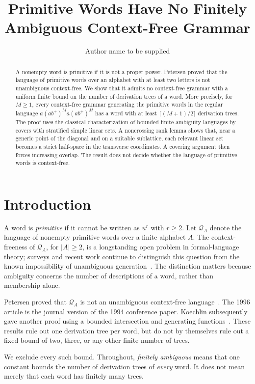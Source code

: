 \documentclass[a4paper,USenglish,cleveref,autoref]{lipics-v2021}
\title{Primitive Words Have No Finitely Ambiguous Context-Free Grammar}
\author{Author name to be supplied}{Affiliation and country to be supplied}{}{}{}
\newcommand{\Q}{\mathcal Q}
\begin{document}
\maketitle
\begin{abstract}
A nonempty word is primitive if it is not a proper power.
Petersen proved that the language of primitive words over an alphabet with at least two letters is not unambiguous context-free.
We show that it admits no context-free grammar with a uniform finite bound on the number of derivation trees of a word.
More precisely, for $M\geq 1$, every context-free grammar generating the primitive words in the regular language $a(ab^+)^M a(ab^+)^M$ has a word with at least $\lceil(M+1)/2\rceil$ derivation trees.
The proof uses the classical characterization of bounded finite-ambiguity languages by covers with stratified simple linear sets.
A noncrossing rank lemma shows that, near a generic point of the diagonal and on a suitable sublattice, each relevant linear set becomes a strict half-space in the transverse coordinates.
A covering argument then forces increasing overlap.
The result does not decide whether the language of primitive words is context-free.
\end{abstract}

\section{Introduction}
A word is \emph{primitive} if it cannot be written as $u^r$ with $r\geq 2$.
Let $\Q_A$ denote the language of nonempty primitive words over a finite alphabet $A$.
The context-freeness of $\Q_A$, for $|A|\geq 2$, is a longstanding open problem in formal-language theory; surveys and recent work continue to distinguish this question from the known impossibility of unambiguous generation~\cite{Lischke2011,Amarilli2026}.
The distinction matters because ambiguity concerns the number of descriptions of a word, rather than membership alone.

Petersen proved that $\Q_A$ is not an unambiguous context-free language~\cite{Petersen1994,Petersen1996}.
The 1996 article is the journal version of the 1994 conference paper.
Koechlin subsequently gave another proof using a bounded intersection and generating functions~\cite[Proposition 17]{Koechlin2022}.
These results rule out one derivation tree per word, but do not by themselves rule out a fixed bound of two, three, or any other finite number of trees.

We exclude every such bound.
Throughout, \emph{finitely ambiguous} means that one constant bounds the number of derivation trees of \emph{every} word.
It does not mean merely that each word has finitely many trees.
\end{document}
